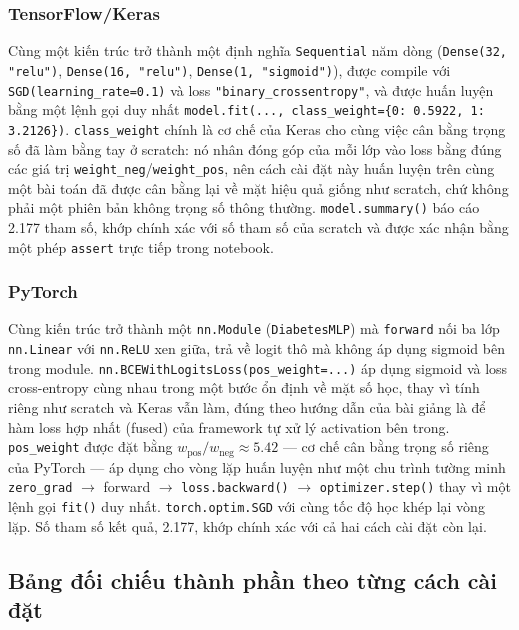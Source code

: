 \documentclass[11pt]{article}
\newcommand{\code}[1]{\texttt{#1}}
\begin{document}
\subsubsection{TensorFlow/Keras}

Cùng một kiến trúc trở thành một định nghĩa \code{Sequential} năm dòng
(\code{Dense(32, "relu")}, \code{Dense(16, "relu")}, \code{Dense(1,
"sigmoid")}), được compile với \code{SGD(learning\_rate=0.1)} và loss
\code{"binary\_crossentropy"}, và được huấn luyện bằng một lệnh gọi duy
nhất \code{model.fit(..., class\_weight=\{0: 0.5922, 1: 3.2126\})}.
\code{class\_weight} chính là cơ chế của Keras cho cùng việc cân bằng
trọng số đã làm bằng tay ở scratch: nó nhân đóng góp của mỗi lớp vào loss
bằng đúng các giá trị \verb|weight_neg|/\verb|weight_pos|, nên cách cài
đặt này huấn luyện trên cùng một bài toán đã được cân bằng lại về mặt hiệu
quả giống như scratch, chứ không phải một phiên bản không trọng số thông
thường. \code{model.summary()} báo cáo 2.177 tham số, khớp chính xác với
số tham số của scratch và được xác nhận bằng một phép \code{assert} trực
tiếp trong notebook.

\subsubsection{PyTorch}

Cùng kiến trúc trở thành một \code{nn.Module} (\code{DiabetesMLP}) mà
\code{forward} nối ba lớp \code{nn.Linear} với \code{nn.ReLU} xen giữa,
trả về logit thô mà không áp dụng sigmoid bên trong module.
\code{nn.BCEWithLogitsLoss(pos\_weight=...)} áp dụng sigmoid và loss
cross-entropy cùng nhau trong một bước ổn định về mặt số học, thay vì tính
riêng như scratch và Keras vẫn làm, đúng theo hướng dẫn của bài giảng là
để hàm loss hợp nhất (fused) của framework tự xử lý activation bên trong.
\code{pos\_weight} được đặt bằng
$w_{\text{pos}} / w_{\text{neg}} \approx 5.42$ — cơ chế cân bằng trọng số
riêng của PyTorch — áp dụng cho vòng lặp huấn luyện như một chu trình tường
minh \code{zero\_grad} $\to$ forward $\to$ \code{loss.backward()} $\to$
\code{optimizer.step()} thay vì một lệnh gọi \code{fit()} duy nhất.
\code{torch.optim.SGD} với cùng tốc độ học khép lại vòng lặp. Số tham số
kết quả, 2.177, khớp chính xác với cả hai cách cài đặt còn lại.

\subsection{Bảng đối chiếu thành phần theo từng cách cài đặt}
\end{document}
